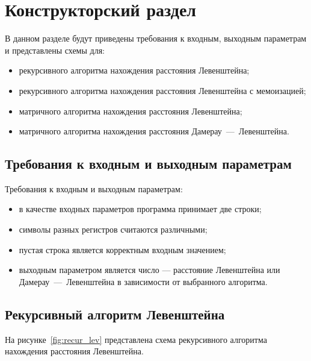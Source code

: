 \chapter{Конструкторский раздел}

В данном разделе будут приведены требования к входным, выходным параметрам и представлены схемы для:
\begin{itemize}[label=--]
    \item рекурсивного алгоритма нахождения расстояния Левенштейна;
    \item рекурсивного алгоритма нахождения расстояния Левенштейна с мемоизацией;
    \item матричного алгоритма нахождения расстояния Левенштейна;
    \item матричного алгоритма нахождения расстояния Дамерау~---~Левенштейна.
\end{itemize}

\section{Требования к входным и выходным параметрам}

Требования к входным и выходным параметрам:
\begin{itemize}[label=--]
    \item в качестве входных параметров программа принимает две строки;
    \item символы разных регистров считаются различными;
    \item пустая строка является корректным входным значением;
    \item выходным параметром является число --- расстояние Левенштейна или Дамерау~---~Левенштейна в зависимости от выбранного алгоритма.
\end{itemize}

\section{Рекурсивный алгоритм Левенштейна}

На рисунке~\ref{fig:recur_lev} представлена схема рекурсивного алгоритма нахождения расстояния Левенштейна.


